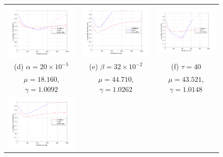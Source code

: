 \begin{figure}
\begin{tabular}{ccc}
	        \hspace{-0.6cm}\includegraphics[width=0.35\columnwidth]{img/fig_b_1001_v0_lambda1500_mu18_1603_gamma1_009200_iter_2_rho0_0.pdf} & 
	        \hspace{-0.6cm}\includegraphics[width=0.35\columnwidth]{img/fig_f_2001_v0_lambda1500_mu44_7099_gamma1_026200_iter_2_rho0_0.pdf} &
	        \hspace{-0.6cm}\includegraphics[width=0.35\columnwidth]{img/fig_j_3001_v0_lambda1500_mu43_5209_gamma1_014800_iter_2_rho0_0.pdf}\\
	        (d) $\alpha = 20 \times 10^{-5}$ & 
	        (e) $\beta  = 32 \times 10^{-2}$ & 
	        (f) $\tau   = 40$\\
	        $\mu = 18.160$, $\gamma = 1.0092$ &
            $\mu = 44.710$, $\gamma = 1.0262$ &
            $\mu = 43.521$, $\gamma = 1.0148$ \\
	        \hspace{-0.6cm}\includegraphics[width=0.35\columnwidth]{img/fig_c_1002_v0_lambda1500_mu18_0462_gamma1_014800_iter_2_rho0_0.pdf} & 

\end{tabular}
\end{figure}
